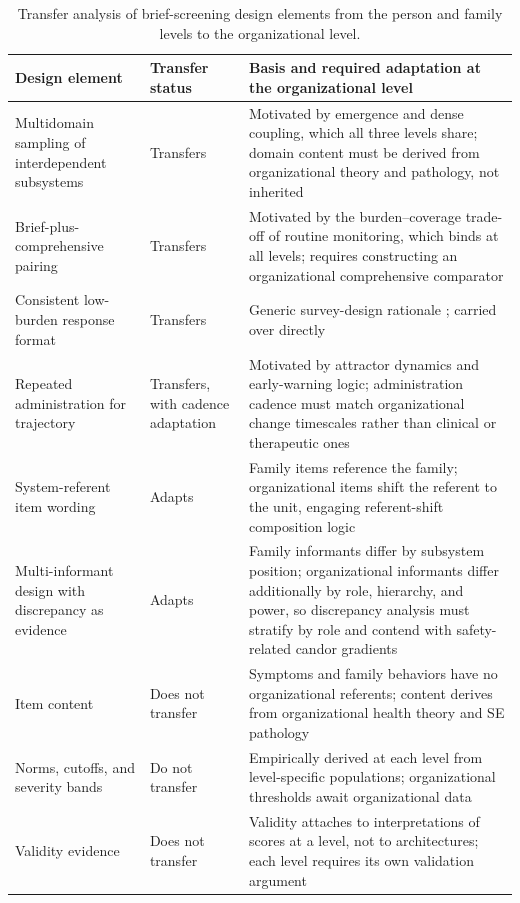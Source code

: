 \documentclass[12pt, letterpaper]{article}
\begin{document}
\begin{table}[htbp]
\centering
\small
\caption{Transfer analysis of brief-screening design elements from the person and family levels to the organizational level.}
\label{tab:transfer}
\begin{tabular}{L{4.4cm}L{2.3cm}L{7.0cm}}
\toprule
Design element & Transfer status & Basis and required adaptation at the organizational level \\
\midrule
Multidomain sampling of interdependent subsystems & Transfers & Motivated by emergence and dense coupling, which all three levels share; domain content must be derived from organizational theory and pathology, not inherited \\
\midrule
Brief-plus-comprehensive pairing & Transfers & Motivated by the burden--coverage trade-off of routine monitoring, which binds at all levels; requires constructing an organizational comprehensive comparator \\
\midrule
Consistent low-burden response format & Transfers & Generic survey-design rationale \parencite{clark1995,hinkin1998}; carried over directly \\
\midrule
Repeated administration for trajectory & Transfers, with cadence adaptation & Motivated by attractor dynamics and early-warning logic; administration cadence must match organizational change timescales rather than clinical or therapeutic ones \\
\midrule
System-referent item wording & Adapts & Family items reference the family; organizational items shift the referent to the unit, engaging referent-shift composition logic \parencite{chan1998} \\
\midrule
Multi-informant design with discrepancy as evidence & Adapts & Family informants differ by subsystem position; organizational informants differ additionally by role, hierarchy, and power, so discrepancy analysis must stratify by role and contend with safety-related candor gradients \parencite{edmondson1999,delosreyes2005} \\
\midrule
Item content & Does not transfer & Symptoms and family behaviors have no organizational referents; content derives from organizational health theory and SE pathology \parencite{davidz2018} \\
\midrule
Norms, cutoffs, and severity bands & Do not transfer & Empirically derived at each level from level-specific populations; organizational thresholds await organizational data \\
\midrule
Validity evidence & Does not transfer & Validity attaches to interpretations of scores at a level, not to architectures; each level requires its own validation argument \parencite{kane2006,aera2014} \\
\bottomrule
\end{tabular}
\end{table}
\end{document}
